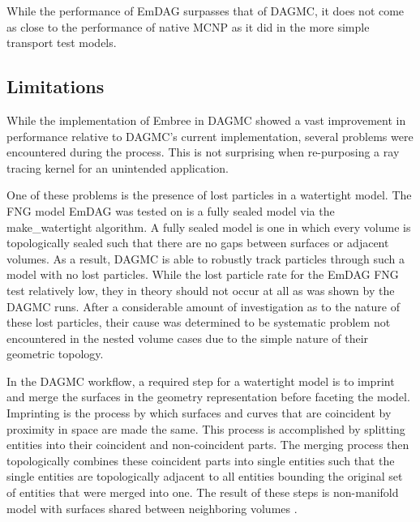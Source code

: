 While the performance of EmDAG surpasses that of DAGMC, it does not come
as close to the performance of native MCNP as it did in the more simple
transport test models.

\subsection{Limitations}\label{sec:emdag_limitations}

While the implementation of Embree in DAGMC showed a vast improvement in
performance relative to DAGMC's current implementation, several problems were
encountered during the process. This is not surprising when re-purposing a ray
tracing kernel for an unintended application.

One of these problems is the presence of lost particles in a watertight
model. The FNG model EmDAG was tested on is a fully sealed model via the
make\_watertight algorithm. A fully sealed model is one in which every volume is
topologically sealed such that there are no gaps between surfaces or adjacent
volumes. As a result, DAGMC is able to robustly track particles through such a
model with no lost particles. While the lost particle rate for the EmDAG FNG
test relatively low, they in theory should not occur at all as was shown by the
DAGMC runs. After a considerable amount of investigation as to the nature of
these lost particles, their cause was determined to be systematic problem not
encountered in the nested volume cases due to the simple nature of their
geometric topology.

In the DAGMC workflow, a required step for a watertight model is to imprint and
merge the surfaces in the geometry representation before faceting the
model. Imprinting is the process by which surfaces and curves that are
coincident by proximity in space are made the same. This process is accomplished
by splitting entities into their coincident and non-coincident parts. The
merging process then topologically combines these coincident parts into single
entities such that the single entities are topologically adjacent to all
entities bounding the original set of entities that were merged into one. The
result of these steps is non-manifold model with surfaces shared between
neighboring volumes \cite{Smith_2011}.

